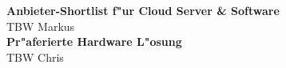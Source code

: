 \textbf{Anbieter-Shortlist f"ur Cloud Server \& Software}\\
TBW Markus\\

\textbf{Pr"aferierte Hardware L"osung}\\
TBW Chris\\